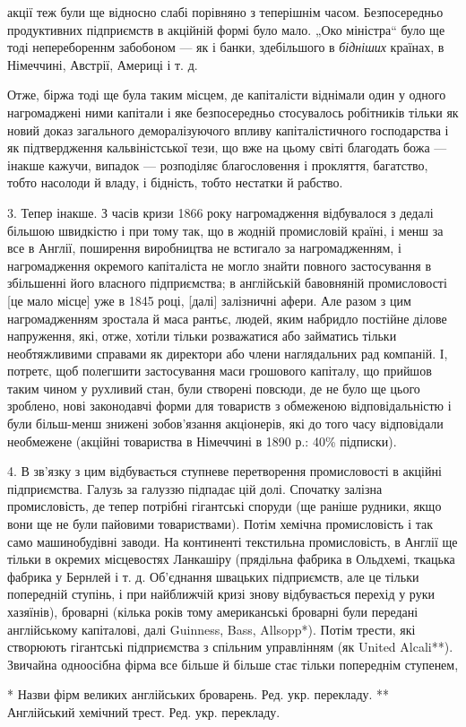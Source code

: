 \parcont{}  %
акції теж були ще відносно слабі порівняно з теперішнім часом. Безпосередньо продуктивних підприємств в акційній формі було
мало. „Око міністра“ було ще тоді неперебореннм забобоном — як і банки, здебільшого в \emph{бідніших} країнах, в Німеччині,
Австрії, Америці і т. д.

Отже, біржа тоді ще була таким місцем, де капіталісти віднімали один у одного нагромаджені ними
капітали і яке безпосередньо стосувалось робітників тільки як новий доказ загального деморалізуючого впливу капіталістичного
господарства і як підтвердження кальвіністської тези, що вже на цьому світі благодать божа — інакше кажучи, випадок —
розподіляє благословення і прокляття, багатство, тобто насолоди й владу, і бідність, тобто нестатки й рабство.

3. Тепер інакше. З часів кризи 1866 року нагромадження відбувалося з дедалі більшою швидкістю і при тому так, що в жодній промисловій
країні, і менш за все в Англії, поширення виробництва не встигало за нагромадженням, і нагромадження окремого капіталіста не
могло знайти повного застосування в збільшенні його власного підприємства; в англійській бавовняній промисловості [це мало
місце] уже в 1845 році, [далі] залізничні афери. Але разом з цим нагромадженням зростала й маса рантьє, людей, яким набридло
постійне ділове напруження, які, отже, хотіли тільки розважатися або займатись тільки необтяжливими справами як директори
або члени наглядальних рад компаній. І, потретє, щоб полегшити застосування маси грошового капіталу, що прийшов таким чином
у рухливий стан, були створені повсюди, де не було ще цього зроблено, нові законодавчі форми для товариств з обмеженою
відповідальністю і були більш-менш знижені зобов’язання акціонерів, які до того часу відповідали необмежене (акційні
товариства в Німеччині в 1890 р.: 40\% підписки).

4. В зв’язку з цим відбувається ступневе перетворення промисловості в акційні підприємства. Галузь за галуззю підпадає цій
долі. Спочатку залізна промисловість, де тепер потрібні гігантські споруди (ще раніше рудники, якщо вони ще не були пайовими
товариствами). Потім хемічна промисловість і так само машинобудівні заводи. На континенті текстильна промисловість, в Англії
ще тільки в окремих місцевостях Ланкашіру (прядільна фабрика в Ольдхемі, ткацька фабрика у Бернлей і т. д. Об’єднання
швацьких підприємств, але це тільки попередній ступінь, і при найближчій кризі знову відбувається перехід у руки хазяїнів),
броварні (кілька років тому американські броварні були передані англійському капіталові, далі Guinness, Bass,  Allsopp*).
Потім трести, які створюють гігантські підприємства з спільним управлінням (як United Alcali**). Звичайна одноосібна фірма
все більше й більше стає тільки попереднім ступенем,

* Назви фірм великих англійських броварень. Ред. укр. перекладу.
** Англійський хемічний трест. Ред. укр. перекладу.
\parbreak{}  %
